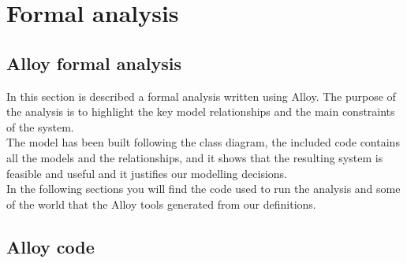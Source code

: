 \chapter{Formal analysis}
\section{Alloy formal analysis}

In this section is described a formal analysis written using Alloy. The purpose of the analysis is to highlight the key model relationships and the main constraints of the system. \\

The model has been built following the class diagram, the included code contains all the models and the relationships, and it shows that the resulting system is feasible and useful and it justifies our modelling decisions.\\

In the following sections you will find the code used to run the analysis and some of the world that the Alloy tools generated from our definitions.

\clearpage
\newpage

\section{Alloy code}




